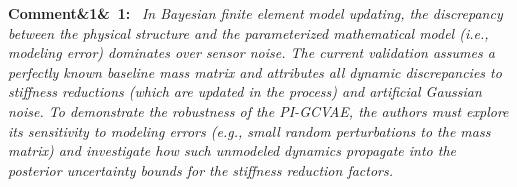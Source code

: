 \documentclass[11pt]{article}
\newenvironment{rcomment}[1]{\par\bigskip\noindent\textbf{Comment\ifx&#1&\else\ #1\fi:}\ \itshape}{\par}
\begin{document}
\begin{rcomment}{1}
In Bayesian finite element model updating, the discrepancy between the physical structure and the parameterized
mathematical model (i.e., modeling error) dominates over sensor noise. The current validation assumes a perfectly known
baseline mass matrix and attributes all dynamic discrepancies to stiffness reductions (which are updated in the process)
and artificial Gaussian noise. To demonstrate the robustness of the PI-GCVAE, the authors must explore its sensitivity
to modeling errors (e.g., small random perturbations to the mass matrix) and investigate how such unmodeled dynamics
propagate into the posterior uncertainty bounds for the stiffness reduction factors.
\end{rcomment}
\end{document}
